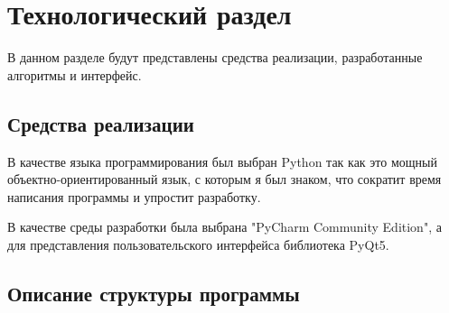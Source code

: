 \chapter{Технологический раздел}
\label{cha:impl}
В данном разделе будут представлены средства реализации, разработанные алгоритмы и интерфейс.

\section{Средства реализации}
\label{sec:realisation}
В качестве языка программирования был выбран Python так как это мощный объектно-ориентированный язык, с которым я был знаком, что сократит время написания программы и упростит разработку.
\par В качестве среды разработки была выбрана "PyCharm Community Edition", а для представления пользовательского интерфейса библиотека PyQt5.

\section{Описание структуры программы}
\label{sec:structure}
